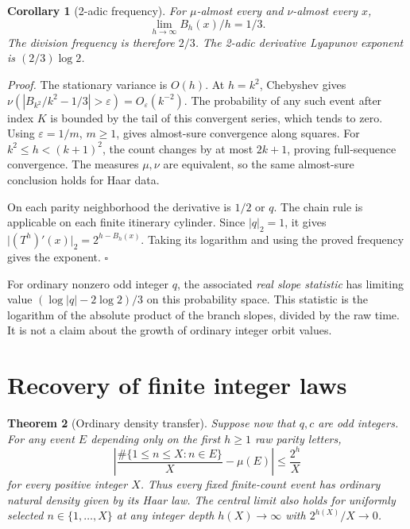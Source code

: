 \documentclass[11pt,letterpaper]{article}
\newtheorem{theorem}{Theorem}
\newtheorem{corollary}[theorem]{Corollary}
\newenvironment{proof}{\noindent\textit{Proof.}}{\hfill\(\square\)}
\begin{document}
\begin{corollary}[2-adic frequency]
For \(\mu\)-almost every and \(\nu\)-almost every \(x\),
\[
\lim_{h\to\infty}B_h(x)/h=1/3.
\]
The division frequency is therefore \(2/3\). The 2-adic derivative
Lyapunov exponent is \((2/3)\log2\).
\end{corollary}

\begin{proof}
The stationary variance is \(O(h)\). At \(h=k^2\), Chebyshev gives
\(\nu(|B_{k^2}/k^2-1/3|>\varepsilon)=O_\varepsilon(k^{-2})\).
The probability of any such event after index \(K\) is bounded
by the tail of this convergent series, which tends to zero.
Using \(\varepsilon=1/m\), \(m\ge1\), gives almost-sure convergence
along squares. For \(k^2\le h<(k+1)^2\), the count changes by at
most \(2k+1\), proving full-sequence convergence. The measures
\(\mu,\nu\) are equivalent, so the same almost-sure conclusion
holds for Haar data.

On each parity neighborhood the derivative is \(1/2\) or \(q\).
The chain rule is applicable on each finite itinerary cylinder.
Since \(|q|_2=1\), it gives
\(\lvert(T^h)'(x)\rvert_2=2^{h-B_h(x)}\).
Taking its logarithm and using the proved frequency gives
the exponent.
\end{proof}

For ordinary nonzero odd integer \(q\), the associated
\emph{real slope statistic} has limiting value
\((\log|q|-2\log2)/3\) on this probability space. This statistic
is the logarithm of the absolute product of the branch slopes,
divided by the raw time. It is not a claim about the growth of ordinary
integer orbit values.

\section{Recovery of finite integer laws}

\begin{theorem}[Ordinary density transfer]
\label{thm:transfer}
Suppose now that \(q,c\) are odd integers. For any event \(E\)
depending only on the first \(h\ge1\) raw parity letters,
\[
\left|\frac{\#\{1\le n\le X:n\in E\}}X-\mu(E)\right|
\le\frac{2^h}{X}
\]
for every positive integer \(X\).
Thus every fixed finite-count event has ordinary natural density
given by its Haar law. The central limit also holds for uniformly
selected \(n\in\{1,\ldots,X\}\) at any integer depth \(h(X)\to\infty\)
with \(2^{h(X)}/X\to0\).
\end{theorem}
\end{document}

